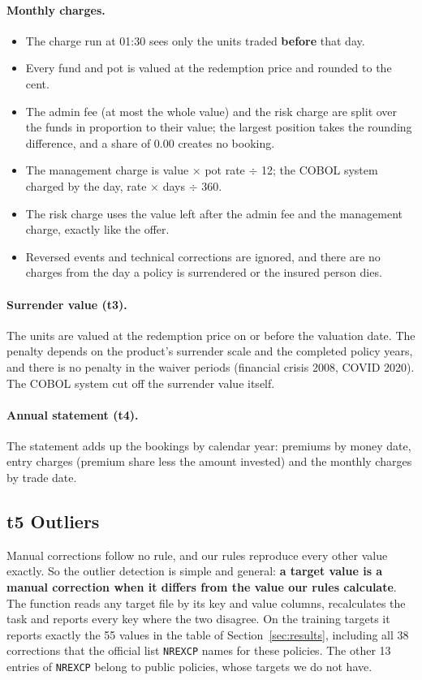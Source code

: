 \documentclass[11pt,a4paper]{article}
\newcommand{\code}[1]{\texttt{#1}}
\begin{document}
\paragraph{Monthly charges.}
\begin{itemize}
  \item The charge run at 01:30 sees only the units traded \textbf{before} that day.
  \item Every fund and pot is valued at the redemption price and rounded to the cent.
  \item The admin fee (at most the whole value) and the risk charge are split over the funds in proportion to
        their value; the largest position takes the rounding difference, and a share of 0.00 creates no booking.
  \item The management charge is value $\times$ pot rate $\div$ 12; the COBOL system charged by the day,
        rate $\times$ days $\div$ 360.
  \item The risk charge uses the value left after the admin fee and the management charge, exactly like the offer.
  \item Reversed events and technical corrections are ignored, and there are no charges from the day a policy is
        surrendered or the insured person dies.
\end{itemize}

\paragraph{Surrender value (t3).}
The units are valued at the redemption price on or before the valuation date. The penalty depends on the product's
surrender scale and the completed policy years, and there is no penalty in the waiver periods (financial crisis 2008,
COVID 2020). The COBOL system cut off the surrender value itself.

\paragraph{Annual statement (t4).}
The statement adds up the bookings by calendar year: premiums by money date, entry charges (premium share less the
amount invested) and the monthly charges by trade date.

\subsection{t5 Outliers}
Manual corrections follow no rule, and our rules reproduce every other value exactly. So the outlier detection is
simple and general: \textbf{a target value is a manual correction when it differs from the value our rules
calculate}. The function reads any target file by its key and value columns, recalculates the task and reports
every key where the two disagree. On the training targets it reports exactly the 55 values in the table of
Section~\ref{sec:results}, including all 38 corrections that the official list \code{NREXCP} names for these
policies. The other 13 entries of \code{NREXCP} belong to public policies, whose targets we do not have.
\end{document}
